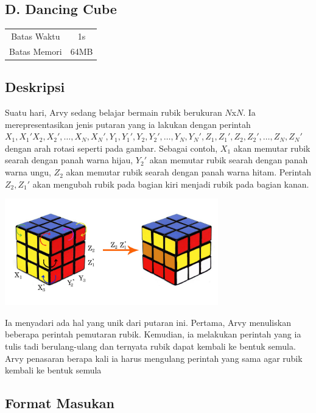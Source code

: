 \documentclass{article}
\begin{document}
\begin{center}
    \section*{D. Dancing Cube} %

    \begin{tabular}{ | c c | }
        \hline
        Batas Waktu  & 1s \\    %
        Batas Memori & 64MB \\  %
        \hline
    \end{tabular}
\end{center}

\subsection*{Deskripsi}

Suatu hari, Arvy sedang belajar bermain rubik berukuran $N$x$N$.
Ia merepresentasikan jenis putaran yang ia lakukan dengan perintah $X_1,X_1'X_2,X_2',\dots,X_N,X_N',Y_1,Y_1',Y_2,Y_2',\dots,Y_N,Y_N',Z_1,Z_1',Z_2,Z_2',\dots,Z_N,Z_N'$ dengan arah rotasi seperti pada gambar. 
Sebagai contoh, $X_1$ akan memutar rubik searah dengan panah warna hijau, $Y_2'$ akan memutar rubik searah dengan panah warna ungu, $Z_2$ akan memutar rubik searah dengan panah warna hitam. Perintah $Z_2,Z_1'$ akan mengubah rubik pada bagian kiri menjadi rubik pada bagian kanan.

\begin{center}
    \includegraphics[width=350px]{rubic}
\end{center}
Ia menyadari ada hal yang unik dari putaran ini.
Pertama, Arvy menuliskan beberapa perintah pemutaran rubik.
Kemudian, ia melakukan perintah yang ia tulis tadi berulang-ulang dan ternyata rubik dapat kembali ke bentuk semula.
Arvy penasaran berapa kali ia harus mengulang perintah yang sama agar rubik kembali ke bentuk semula

\subsection*{Format Masukan}
\end{document}
